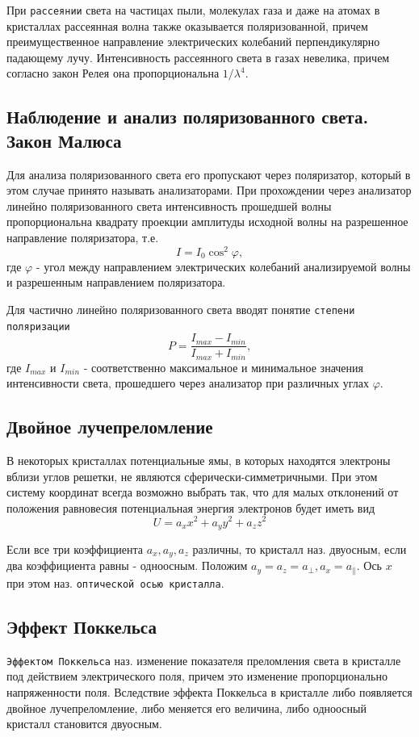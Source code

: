 \documentclass[a4paper,12pt]{article}
\begin{document}
При \texttt{рассеянии} света на частицах пыли, молекулах газа и даже на атомах в кристаллах рассеянная волна также оказывается поляризованной, причем преимущественное направление электрических колебаний перпендикулярно падающему лучу. Интенсивность рассеянного света в газах невелика, причем согласно закон Релея она пропорциональна $1/\lambda^4$.

\subsection{Наблюдение и анализ поляризованного света. Закон Малюса}

Для анализа поляризованного света его пропускают через поляризатор, который в этом случае принято называть анализаторами. При прохождении через анализатор линейно поляризованного света интенсивность прошедшей волны пропорциональна квадрату проекции амплитуды исходной волны на разрешенное направление поляризатора, т.е.
$$
I=I_0\cos^2{\varphi},
$$
где $\varphi$ - угол между направлением электрических колебаний анализируемой волны и разрешенным направлением поляризатора. 

Для частично линейно поляризованного света вводят понятие \texttt{степени поляризации}
$$
P=\frac{I_{max}-I_{min}}{I_{max}+I_{min}},
$$
где $I_{max}$ и $I_{min}$ - соответственно максимальное и минимальное значения интенсивности света, прошедшего через анализатор при различных углах $\varphi$.

\subsection{Двойное лучепреломление}

В некоторых кристаллах потенциальные ямы, в которых находятся электроны вблизи углов решетки, не являются сферически-симметричными. При этом систему координат всегда возможно выбрать так, что для малых отклонений от положения равновесия потенциальная энергия электронов будет иметь вид 
$$
U=a_xx^2+a_yy^2+a_zz^2
$$

Если все три коэффициента $a_x, a_y, a_z$ различны, то кристалл наз. двуосным, если два коэффициента равны - одноосным. Положим $a_y=a_z=a_\perp, a_x=a_\|$. Ось $x$ при этом наз. \texttt{оптической осью кристалла}. 

\subsection{Эффект Поккельса}

\texttt{Эффектом Поккельса} наз. изменение показателя преломления света в кристалле под действием электрического поля, причем это изменение пропорционально напряженности поля. Вследствие эффекта Поккельса в кристалле либо появляется двойное лучепреломление, либо меняется его величина, либо одноосный кристалл становится двуосным.
\end{document}
